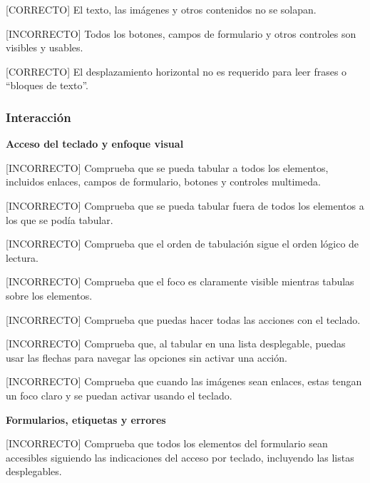 \documentclass[spanish]{article}
\begin{document}
[CORRECTO] El texto, las imágenes y otros contenidos no se solapan.\newline

[INCORRECTO] Todos los botones, campos de formulario y otros controles son
visibles y usables.\newline

[CORRECTO] El desplazamiento horizontal no es requerido para leer frases o
``bloques de texto''.

\subsubsection{Interacción}

\textbf{Acceso del teclado y enfoque visual}\newline

[INCORRECTO] Comprueba que se pueda tabular a todos los elementos, incluidos
enlaces, campos de formulario, botones y controles multimeda.\newline

[INCORRECTO] Comprueba que se pueda tabular fuera de todos los elementos a los
que se podía tabular.\newline

[INCORRECTO] Comprueba que el orden de tabulación sigue el orden lógico de
lectura.\newline

[INCORRECTO] Comprueba que el foco es claramente visible mientras tabulas sobre
los elementos.\newline

[INCORRECTO] Comprueba que puedas hacer todas las acciones con el teclado.\newline

[INCORRECTO] Comprueba que, al tabular en una lista desplegable, puedas usar las
flechas para navegar las opciones sin activar una acción.\newline

[INCORRECTO] Comprueba que cuando las imágenes sean enlaces, estas tengan un
foco claro y se puedan activar usando el teclado.\newline

\newpage

\textbf{Formularios, etiquetas y errores}\newline

[INCORRECTO] Comprueba que todos los elementos del formulario sean accesibles
siguiendo las indicaciones del acceso por teclado, incluyendo las listas
desplegables.\newline
\end{document}

